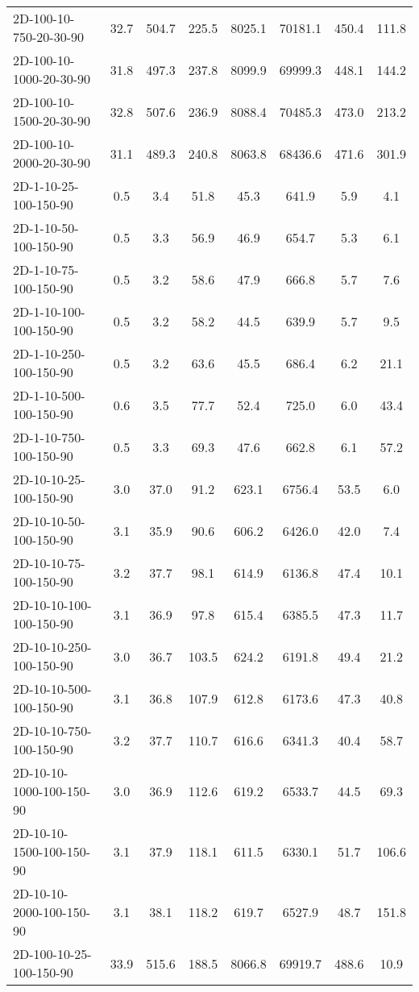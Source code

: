 \documentclass{article}
\begin{document}
\begin{center}
\begin{table}[h]
\begin{tabular}{|l||c|c|c|c|c|c|c|}
    2D-100-10-750-20-30-90 & 32.7 & 504.7 & 225.5 & 8025.1 & 70181.1 & 450.4 & 111.8 \\
    2D-100-10-1000-20-30-90 & 31.8 & 497.3 & 237.8 & 8099.9 & 69999.3 & 448.1 & 144.2 \\
    2D-100-10-1500-20-30-90 & 32.8 & 507.6 & 236.9 & 8088.4 & 70485.3 & 473.0 & 213.2 \\
    2D-100-10-2000-20-30-90 & 31.1 & 489.3 & 240.8 & 8063.8 & 68436.6 & 471.6 & 301.9 \\
    \hline
    2D-1-10-25-100-150-90 & 0.5 & 3.4 & 51.8 & 45.3 & 641.9 & 5.9 & 4.1 \\
    2D-1-10-50-100-150-90 & 0.5 & 3.3 & 56.9 & 46.9 & 654.7 & 5.3 & 6.1 \\
    2D-1-10-75-100-150-90 & 0.5 & 3.2 & 58.6 & 47.9 & 666.8 & 5.7 & 7.6 \\
    2D-1-10-100-100-150-90 & 0.5 & 3.2 & 58.2 & 44.5 & 639.9 & 5.7 & 9.5 \\
    2D-1-10-250-100-150-90 & 0.5 & 3.2 & 63.6 & 45.5 & 686.4 & 6.2 & 21.1 \\
    2D-1-10-500-100-150-90 & 0.6 & 3.5 & 77.7 & 52.4 & 725.0 & 6.0 & 43.4 \\
    2D-1-10-750-100-150-90 & 0.5 & 3.3 & 69.3 & 47.6 & 662.8 & 6.1 & 57.2 \\
    \hline
    2D-10-10-25-100-150-90 & 3.0 & 37.0 & 91.2 & 623.1 & 6756.4 & 53.5 & 6.0 \\
    2D-10-10-50-100-150-90 & 3.1 & 35.9 & 90.6 & 606.2 & 6426.0 & 42.0 & 7.4 \\
    2D-10-10-75-100-150-90 & 3.2 & 37.7 & 98.1 & 614.9 & 6136.8 & 47.4 & 10.1 \\
    2D-10-10-100-100-150-90 & 3.1 & 36.9 & 97.8 & 615.4 & 6385.5 & 47.3 & 11.7 \\
    2D-10-10-250-100-150-90 & 3.0 & 36.7 & 103.5 & 624.2 & 6191.8 & 49.4 & 21.2 \\
    2D-10-10-500-100-150-90 & 3.1 & 36.8 & 107.9 & 612.8 & 6173.6 & 47.3 & 40.8 \\
    2D-10-10-750-100-150-90 & 3.2 & 37.7 & 110.7 & 616.6 & 6341.3 & 40.4 & 58.7 \\
    2D-10-10-1000-100-150-90 & 3.0 & 36.9 & 112.6 & 619.2 & 6533.7 & 44.5 & 69.3 \\
    2D-10-10-1500-100-150-90 & 3.1 & 37.9 & 118.1 & 611.5 & 6330.1 & 51.7 & 106.6 \\
    2D-10-10-2000-100-150-90 & 3.1 & 38.1 & 118.2 & 619.7 & 6527.9 & 48.7 & 151.8 \\
    \hline
    2D-100-10-25-100-150-90 & 33.9 & 515.6 & 188.5 & 8066.8 & 69919.7 & 488.6 & 10.9 \\

\end{tabular}
\end{table}
\end{center}
\end{document}
